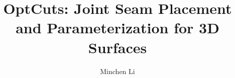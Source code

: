 \documentclass[acmtog, review, anonymous]{acmart}
\begin{document}
\title{OptCuts: Joint %
Seam Placement and Parameterization for 3D Surfaces} 

\author{Minchen Li}

\renewcommand\shortauthors{Li, M. et al}

\newcommand{\minchen}[1]{\textcolor{blue}{\textbf{Minchen: #1}}}
\newcommand{\justin}[1]{\textcolor{red}{\textbf{Justin: #1}}}
\newcommand{\alla}[1]{\textcolor{orange}{\textbf{Alla: #1}}}
\newcommand{\danny}[1]{\textcolor{purple}{\textbf{Danny: #1}}}
\newcommand{\vova}[1]{\textcolor{green}{\textbf{Vova: #1}}}
\end{document}
